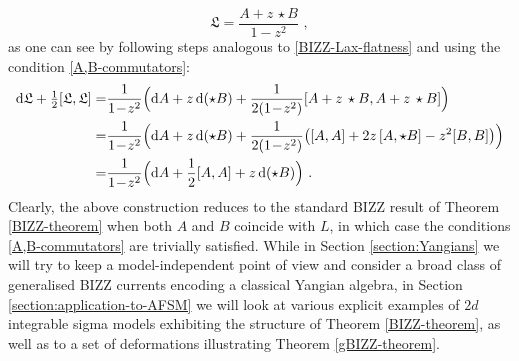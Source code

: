 \documentclass[12pt]{article}
\numberwithin{equation}{section}
\begin{document}
\begin{equation}\label{gBIZZ-Lax}
\mathfrak{L}=\frac{A+z \,\star B}{1-z^2} \,\, ,
\end{equation}
as one can see by following steps analogous to \eqref{BIZZ-Lax-flatness} and using the condition \eqref{A,B-commutators}:
\begin{equation}
\begin{aligned}
\mathrm{d}\mathfrak{L}+\tfrac{1}{2}[\mathfrak{L},\mathfrak{L}]=&\frac{1}{1\!-\!z^2}\Bigl( \mathrm{d}A+z\,\mathrm{d}(\star B)+\frac{1}{2(1\!-\!z^2)} [A+z\,\star B,A+z\,\star B]  \Bigr)
\\
=&\frac{1}{1\!-\!z^2}\Bigl( \mathrm{d}A+z\,\mathrm{d}(\star B)+\frac{1}{2(1\!-\!z^2)} \bigl( [A,A]+2z\,[A,\star B]-z^2[B,B]  \bigr)\Bigr)
\\
=&\frac{1}{1\!-\!z^2}\Bigl( \mathrm{d}A+\frac{1}{2}[A,A]  +z\,\mathrm{d}(\star B)\Bigr) \,\, .
\end{aligned}
\end{equation}
Clearly, the above construction reduces to the standard BIZZ result of Theorem \ref{BIZZ-theorem} when both $A$ and $B$ coincide with $L$, in which case the conditions \eqref{A,B-commutators} are trivially satisfied. While in Section \ref{section:Yangians} we will try to keep a model-independent point of view and consider a broad class of generalised BIZZ currents encoding a classical Yangian algebra, in Section \ref{section:application-to-AFSM} we will look at various explicit examples of $2d$ integrable sigma models exhibiting the structure of Theorem \ref{BIZZ-theorem}, as well as to a set of deformations illustrating Theorem \ref{gBIZZ-theorem}.
\end{document}
